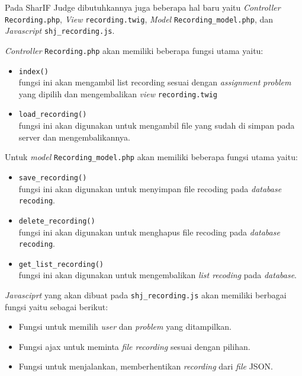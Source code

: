\documentclass[a4paper,twoside]{article}
\begin{document}
\begin{enumerate}
	      Pada SharIF Judge dibutuhkannya juga beberapa hal baru yaitu \textit{Controller} \verb|Recording.php|, \textit{View} \verb|recording.twig|, \textit{Model} \verb|Recording_model.php|, dan \textit{Javascript} \verb|shj_recording.js|.

	      \textit{Controller} \verb|Recording.php| akan memiliki beberapa fungsi utama yaitu:
	      \begin{itemize}
		      \item \verb|index()| \\
		            fungsi ini akan mengambil list recording sesuai dengan \textit{assignment} \textit{problem} yang dipilih dan mengembalikan \textit{view} \verb|recording.twig|
		      \item \verb|load_recording()| \\
		            fungsi ini akan digunakan untuk mengambil file yang sudah di simpan pada server dan mengembalikannya.
	      \end{itemize}

	      Untuk \textit{model} \verb|Recording_model.php| akan memiliki beberapa fungsi utama yaitu:
	      \begin{itemize}
		      \item \verb|save_recording()| \\
		            fungsi ini akan digunakan untuk menyimpan file recoding pada \textit{database} \verb|recoding|.
		      \item \verb|delete_recording()| \\
		            fungsi ini akan digunakan untuk menghapus file recoding pada \textit{database} \verb|recoding|.
		      \item \verb|get_list_recording()| \\
		            fungsi ini akan digunakan untuk mengembalikan \textit{list recoding} pada \textit{database}.
	      \end{itemize}

	      \textit{Javasciprt} yang akan dibuat pada \verb|shj_recording.js| akan memiliki berbagai fungsi yaitu sebagai berikut:

	      \begin{itemize}
		      \item Fungsi untuk memilih \textit{user} dan \textit{problem} yang ditampilkan.
		      \item Fungsi ajax untuk meminta \textit{file recording} sesuai dengan pilihan.
		      \item Fungsi untuk menjalankan, memberhentikan \textit{recording} dari \textit{file} JSON.
	      \end{itemize}


\end{enumerate}
\end{document}

